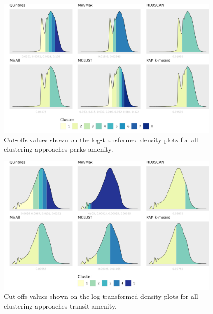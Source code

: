 \documentclass[11pt, a4paper]{article}
\begin{document}
\begin{figure}[H]
\centering
\includegraphics[width=\textwidth]{./cutoffs/by_amenity/Parks_cutoffs.png}
\caption[Parks cutoffs]{Cut-offs values shown on the log-transformed density plots for all clustering approaches parks amenity.}\label{parkscutoffs}
\end{figure}










\begin{figure}[H]
\centering
\includegraphics[width=\textwidth]{./cutoffs/by_amenity/Transit_cutoffs.png}
\caption[Transit cutoffs]{Cut-offs values shown on the log-transformed density plots for all clustering approaches transit amenity.}\label{transitcutoffs}
\end{figure}
\end{document}
